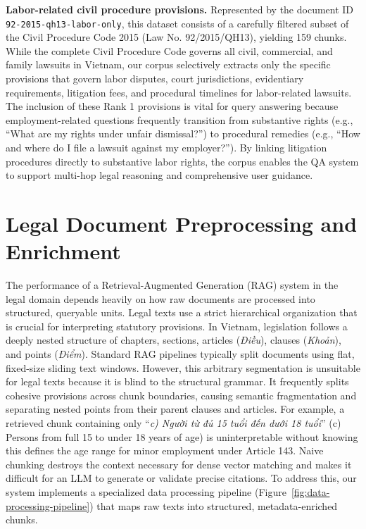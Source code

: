 \textbf{Labor-related civil procedure provisions.} Represented by the document ID \texttt{92-}\allowbreak\texttt{2015-}\allowbreak\texttt{qh13-}\allowbreak\texttt{labor-}\allowbreak\texttt{only}, this dataset consists of a carefully filtered subset of the Civil Procedure Code 2015 (Law No. 92/2015/QH13), yielding 159 chunks. While the complete Civil Procedure Code governs all civil, commercial, and family lawsuits in Vietnam, our corpus selectively extracts only the specific provisions that govern labor disputes, court jurisdictions, evidentiary requirements, litigation fees, and procedural timelines for labor-related lawsuits. The inclusion of these Rank 1 provisions is vital for query answering because employment-related questions frequently transition from substantive rights (e.g., ``What are my rights under unfair dismissal?'') to procedural remedies (e.g., ``How and where do I file a lawsuit against my employer?''). By linking litigation procedures directly to substantive labor rights, the corpus enables the QA system to support multi-hop legal reasoning and comprehensive user guidance.

\section{Legal Document Preprocessing and Enrichment}

The performance of a Retrieval-Augmented Generation (RAG) system in the legal domain depends heavily on how raw documents are processed into structured, queryable units. Legal texts use a strict hierarchical organization that is crucial for interpreting statutory provisions. In Vietnam, legislation follows a deeply nested structure of chapters, sections, articles (\textit{Điều}), clauses (\textit{Khoản}), and points (\textit{Điểm}). Standard RAG pipelines typically split documents using flat, fixed-size sliding text windows. However, this arbitrary segmentation is unsuitable for legal texts because it is blind to the structural grammar. It frequently splits cohesive provisions across chunk boundaries, causing semantic fragmentation and separating nested points from their parent clauses and articles. For example, a retrieved chunk containing only ``\textit{c) Người từ đủ 15 tuổi đến dưới 18 tuổi}'' (c) Persons from full 15 to under 18 years of age) is uninterpretable without knowing this defines the age range for minor employment under Article 143. Naive chunking destroys the context necessary for dense vector matching and makes it difficult for an LLM to generate or validate precise citations. To address this, our system implements a specialized data processing pipeline (Figure~\ref{fig:data-processing-pipeline}) that maps raw texts into structured, metadata-enriched chunks.

